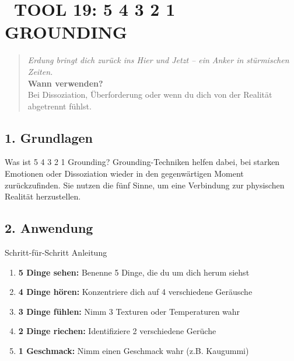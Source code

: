 
\newpage
\section*{\textcolor{ctmmOrange}{\faTools~TOOL 19: 5 4 3 2 1 GROUNDING}}
\label{sec:tool-5-4-3-2-1-grounding}

\begin{quote}
\textit{\textcolor{ctmmOrange}{Erdung bringt dich zurück ins Hier und Jetzt -- ein Anker in stürmischen Zeiten.}}\\
\textbf{\textcolor{ctmmOrange}{Wann verwenden?}}\\
Bei Dissoziation, Überforderung oder wenn du dich von der Realität abgetrennt fühlst.
\end{quote}

\subsection*{\textcolor{ctmmOrange}{1. Grundlagen}}

\begin{ctmmOrangeBox}{Was ist 5 4 3 2 1 Grounding?}
Grounding-Techniken helfen dabei, bei starken Emotionen oder Dissoziation wieder in den gegenwärtigen Moment zurückzufinden. Sie nutzen die fünf Sinne, um eine Verbindung zur physischen Realität herzustellen.
\end{ctmmOrangeBox}

\subsection*{\textcolor{ctmmOrange}{2. Anwendung}}

\begin{ctmmGreenBox}{Schritt-für-Schritt Anleitung}
\begin{enumerate}
  \item \textbf{5 Dinge sehen:} Benenne 5 Dinge, die du um dich herum siehst\n  \item \textbf{4 Dinge hören:} Konzentriere dich auf 4 verschiedene Geräusche\n  \item \textbf{3 Dinge fühlen:} Nimm 3 Texturen oder Temperaturen wahr\n  \item \textbf{2 Dinge riechen:} Identifiziere 2 verschiedene Gerüche\n  \item \textbf{1 Geschmack:} Nimm einen Geschmack wahr (z.B. Kaugummi)
\end{enumerate}
\end{ctmmGreenBox}

